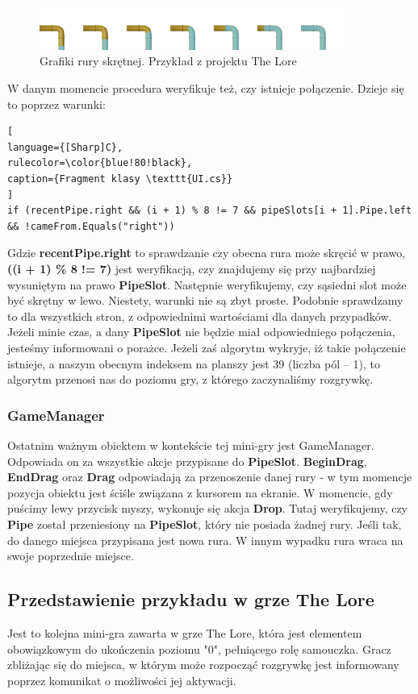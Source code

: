 \documentclass[oneside,polski,logo]{amuthesis}
\begin{document}
\begin{figure}[h]
	\centering
	\includegraphics[width=10cm]{images/tyrek/rury-5.png}
	\caption{Grafiki rury skrętnej. Przykład z projektu The Lore}
\end{figure}
W danym momencie procedura weryfikuje też, czy istnieje połączenie. Dzieje się to poprzez warunki:
\begin{lstlisting}[
language={[Sharp]C},
rulecolor=\color{blue!80!black},
caption={Fragment klasy \texttt{UI.cs}}
]
if (recentPipe.right && (i + 1) % 8 != 7 && pipeSlots[i + 1].Pipe.left 
&& !cameFrom.Equals("right"))
\end{lstlisting}
Gdzie \textbf{recentPipe.right} to sprawdzanie czy obecna rura może skręcić w prawo, \textbf{((i + 1) \% 8 != 7)} jest weryfikacją, czy znajdujemy się przy najbardziej wysuniętym na prawo \textbf{PipeSlot}. Następnie weryfikujemy, czy sąsiedni slot może być skrętny w lewo. Niestety, warunki nie są zbyt proste. Podobnie sprawdzamy to dla wszystkich stron, z odpowiednimi wartościami dla danych przypadków. Jeżeli minie czas, a dany \textbf{PipeSlot} nie będzie miał odpowiedniego połączenia, jesteśmy informowani o porażce. Jeżeli zaś algorytm wykryje, iż takie połączenie istnieje, a naszym obecnym indeksem na planszy jest 39 (liczba pól – 1), to algorytm przenosi nas do poziomu gry, z którego zaczynaliśmy rozgrywkę.

\subsubsection{GameManager}
Ostatnim ważnym obiektem w kontekście tej mini-gry jest GameManager. Odpowiada on za wszystkie akcje przypisane do \textbf{PipeSlot}. \textbf{BeginDrag}, \textbf{EndDrag} oraz \textbf{Drag} odpowiadają za przenoszenie danej rury - w tym momencje pozycja obiektu jest ściśle związana z kursorem na ekranie. W momencie, gdy puścimy lewy przycisk myszy, wykonuje się akcja \textbf{Drop}. Tutaj weryfikujemy, czy \textbf{Pipe} został przeniesiony na \textbf{PipeSlot}, który nie posiada żadnej rury. Jeśli tak, do danego miejsca przypisana jest nowa rura. W innym wypadku rura wraca na swoje poprzednie miejsce. 
\subsection{Przedstawienie przykładu w grze The Lore}
Jest to kolejna mini-gra zawarta w grze The Lore, która jest elementem obowiązkowym do ukończenia poziomu "0", pełniącego rolę samouczka. Gracz zbliżając się do miejsca, w którym może rozpocząć rozgrywkę jest informowany poprzez komunikat o możliwości jej aktywacji.
\end{document}
